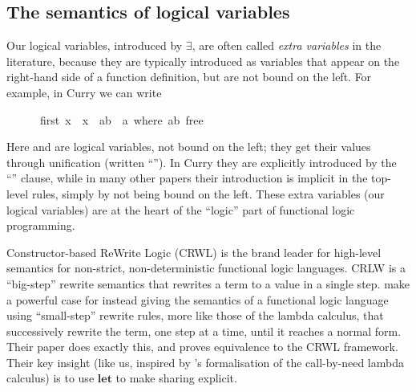 \documentclass[acmsmall,review,anonymous,dvipsnames]{acmart}
\begin{document}
\subsection{The semantics of logical variables} \label{sec:magical}

Our logical variables, introduced by \ensuremath{\exists}, are often called
\emph{extra variables} in the literature, because they
are typically introduced as variables that appear on the right-hand side of a
function definition, but are not bound on the left.  For example, in Curry we can write
\begin{tabbing}\ttfamily
~~~~~~first~x~~x~~ab~~a~where~ab~free
\end{tabbing}
Here  and  are logical variables, not bound on the left; they
get their values through unification (written ``'').   In Curry they are explicitly introduced
by the ``'' clause, while in many other papers their
introduction is implicit in the top-level rules, simply by not being bound
on the left.  These extra variables (our logical variables) are
at the heart of the ``logic'' part of functional logic programming.

Constructor-based ReWrite Logic (CRWL) \cite{crwl} is the brand leader for
high-level semantics for non-strict, non-deterministic functional logic languages.
%
CRLW is a ``big-step'' rewrite semantics that rewrites a term to a value in a single
step.
%
 make a powerful case for instead giving the semantics
of a functional logic language using ``small-step'' rewrite rules, more like those
of the lambda calculus, that successively rewrite the term, one step at
a time, until it reaches a normal form.
Their paper does exactly this, and proves equivalence to the
CRWL framework.  Their key insight (like us, inspired by
\citet{ariola:call-by-need}'s formalisation of the call-by-need lambda calculus)
is to use \ensuremath{\mathbf{let}} to make sharing explicit.
\end{document}

